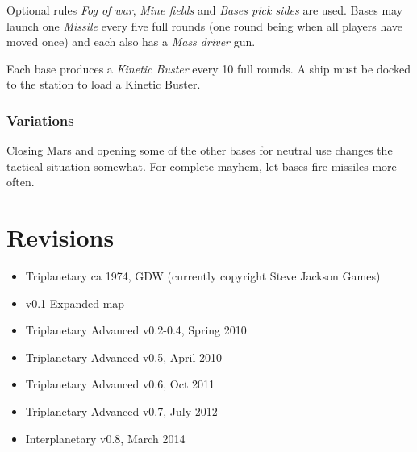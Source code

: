\documentclass[a4paper,12pt,notitlepage,twocolumn]{article}
\begin{document}
Optional rules \emph{Fog of war}, \emph{Mine fields}  and \emph{Bases
  pick sides} are used. Bases may launch one \emph{Missile} every five
full rounds  (one round being when all players have moved once) and
each also has a \emph{Mass driver} gun.  

Each base produces a \emph{Kinetic Buster} every 10 full rounds. A ship must be docked to the
station to load a Kinetic Buster. 

\subsubsection*{Variations}

Closing Mars and opening some of the other bases for neutral use
changes the tactical situation somewhat. For complete mayhem, let
bases fire missiles more often. 


\section*{Revisions}
\begin{itemize}
\item Triplanetary ca 1974, GDW (currently copyright Steve Jackson Games)
\item v0.1 Expanded map
\item Triplanetary Advanced v0.2-0.4, Spring 2010
\item Triplanetary Advanced v0.5, April 2010
\item Triplanetary Advanced v0.6, Oct 2011
\item Triplanetary Advanced v0.7, July 2012
\item Interplanetary v0.8, March 2014
\end{itemize}

\end{document}
